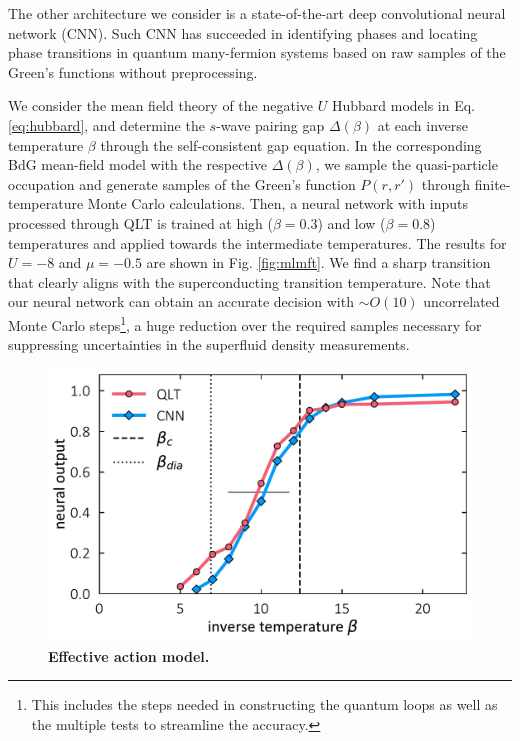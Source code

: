 \documentclass[amsmath,amssymb, aps, prl, twocolumn]{revtex4-1}
\begin{document}
 The other architecture we consider is a state-of-the-art deep convolutional neural network (CNN). Such CNN has succeeded in identifying phases and locating phase transitions in quantum many-fermion systems based on raw samples of the Green's functions\cite{Simon2016} without preprocessing. %

We consider the mean field theory of the negative $U$ Hubbard models in Eq. \ref{eq:hubbard}, and determine the $s$-wave pairing gap $\Delta(\beta)$ at each inverse temperature $\beta$ through the self-consistent gap equation. In the corresponding BdG mean-field model with the respective $\Delta(\beta)$, we sample the quasi-particle occupation and generate samples of the Green's function $P(r,r')$ through finite-temperature Monte Carlo calculations. Then, a neural network with inputs processed through QLT is trained at  high ($\beta=0.3$) and low ($\beta=0.8$) temperatures and applied towards the intermediate temperatures. The results for $U=-8$ and $\mu=-0.5$ are shown in Fig. \ref{fig:mlmft}. We find a sharp transition that clearly aligns with the superconducting transition temperature. Note that our neural network can obtain an accurate decision with $\sim O(10)$ uncorrelated Monte Carlo steps\footnote{This includes the steps needed in constructing the quantum loops as well as the multiple tests to streamline the accuracy.}, a huge reduction over the required samples necessary for suppressing uncertainties in the superfluid density measurements\cite{Hong2016, Erez2016}. 

\begin{figure}
\includegraphics[scale=.43]{fig3.pdf}
\caption{{\bf Effective action model.}}
\label{fig:afmetal}
\end{figure}
\end{document}
